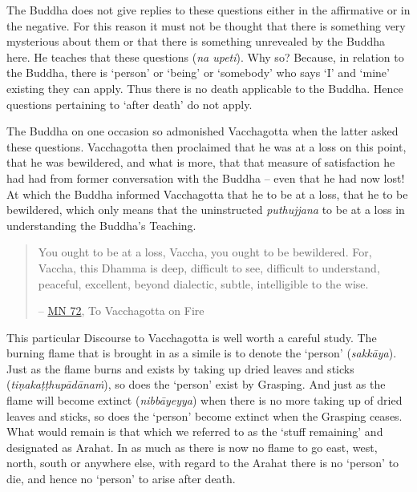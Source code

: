 The Buddha does not give replies to these questions either in the affirmative or in the negative. For this reason it must not be thought that there is something very mysterious about them or that there is something unrevealed by the Buddha here. He teaches that these questions  (\emph{na upeti}). Why so? Because, in relation to the Buddha, there is  `person' or `being' or `somebody' who says `I' and `mine' existing  they can apply. Thus there is no death applicable to the Buddha. Hence questions pertaining to `after death' do not apply.

The Buddha on one occasion so admonished Vacchagotta when the latter asked these questions. Vacchagotta then proclaimed that he was at a loss on this point, that he was bewildered, and what is more, that that measure of satisfaction he had had from former conversation with the Buddha -- even that he had now lost! At which the Buddha informed Vacchagotta that he  to be at a loss, that he  to be bewildered, which only means that the uninstructed \emph{puthujjana}  to be at a loss in understanding the Buddha's Teaching.

\begin{quote}
You ought to be at a loss, Vaccha, you ought to be bewildered. For, Vaccha, this Dhamma is deep, difficult to see, difficult to understand, peaceful, excellent, beyond dialectic, subtle, intelligible to the wise.

 -- \href{https://suttacentral.net/mn72/en/thanissaro}{MN 72}, To Vacchagotta on Fire
\end{quote}

This particular Discourse to Vacchagotta is well worth a careful study. The burning flame that is brought in as a simile is to denote the `person' (\emph{sakkāya}). Just as the flame burns and exists by taking up dried leaves and sticks (\emph{tiṇakaṭṭhupādānaṁ}), so does the `person' exist by Grasping. And just as the flame will become extinct (\emph{nibbāyeyya}) when there is no more taking up of dried leaves and sticks, so does the `person' become extinct when the Grasping ceases. What would remain is that which we referred to as the `stuff remaining' and designated as Arahat. In as much as there is now no flame to go east, west, north, south or anywhere else, with regard to the Arahat there is no `person' to die, and hence no `person' to arise after death.

